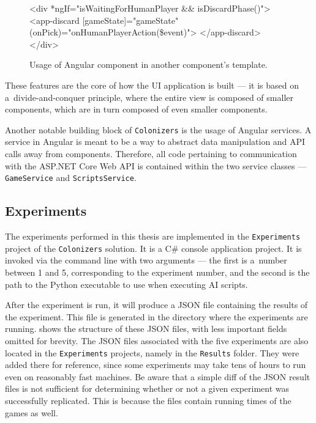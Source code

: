 \begin{figure}[h!]
\begin{code}[commandchars=\\\{\},codes={\catcode`\$=3\catcode`\^=7\catcode`\_=8}]
<div *ngIf="isWaitingForHumanPlayer && isDiscardPhase()">
    <app-discard [gameState]="gameState"
                 (onPick)="onHumanPlayerAction(\$event)">
    </app-discard>
</div>
\end{code}
\caption{Usage of Angular component in another component's template.}\label{dd:componentref}
\end{figure}

These features are the core of how the UI application is built --- it is based on
a~divide-and-conquer principle, where the entire view is composed of smaller components,
which are in turn composed of even smaller components.

Another notable building block of \texttt{Colonizers} is the usage of Angular
services. A service in Angular is meant to be a way to abstract data manipulation
and API calls away from components. Therefore, all code pertaining to
communication with the ASP.NET Core Web API is contained within
the two service classes --- \texttt{GameService} and \texttt{ScriptsService}.

\clearpage
\subsection{Experiments}
\label{chap:experimentdocs}

The experiments performed in this thesis are implemented in the \texttt{Experiments}
project of the \texttt{Colonizers} solution. It is a C\# console application project.
It is invoked via the command line with two arguments --- the first is a~number
between 1 and 5, corresponding to the experiment number, and the second
is the path to the Python executable to use when executing AI scripts.

After the experiment is run, it will produce a JSON file containing the results
of the experiment. This file is generated in the directory where the experiments
are running.
 shows the structure of these JSON files, with less
important fields omitted for brevity. The JSON files associated with the five
experiments are also located in the \texttt{Experiments} projects, namely in
the \texttt{Results} folder. They were added there for reference, since
some experiments may take tens of hours to run even on reasonably fast
machines. Be aware that a simple diff of the JSON result files
is not sufficient for determining whether or not a given experiment was successfully
replicated. This is because the files contain running times of the games as well.

